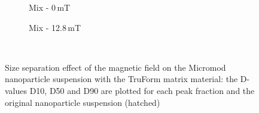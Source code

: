 \begin{figure}
          \begin{subfigure}{0.49\textwidth}
                  \flushleft
                  \caption{Mix - 0\,mT}\label{subfig:mix_0mT}
          \end{subfigure}\hfill
        \begin{subfigure}{0.49\textwidth}
                \flushright
                \caption{Mix - 12.8\,mT}\label{subfig:mix_128mT}
        \end{subfigure}
        \\        
        \caption[Size separation effect of the magnetic field on the Micromod nanoparticle suspension]{Size separation effect of the magnetic field on the Micromod nanoparticle suspension with the TruForm matrix material: the D-values D10, D50 and D90 are plotted for each peak fraction and the original nanoparticle suspension (hatched) }
        \label{fig:micromod_partPGV_values}
  \end{figure}
  
